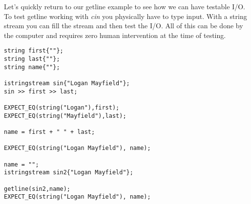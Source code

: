 \documentclass[]{tufte-handout}
\begin{document}
Let's quickly return to our getline example to see how we can have testable I/O.  To test getline working with \textit{cin} you physically have to type input. With a string stream you can fill the stream and then test the I/O. All of this can be done by the computer and requires zero human intervention at the time of testing.
\begin{verbatim}
string first{""};
string last{""};
string name{""};

istringstream sin{"Logan Mayfield"};
sin >> first >> last;

EXPECT_EQ(string("Logan"),first);
EXPECT_EQ(string("Mayfield"),last);
    
name = first + " " + last;

EXPECT_EQ(string("Logan Mayfield"), name);

name = "";
istringstream sin2{"Logan Mayfield"};

getline(sin2,name);
EXPECT_EQ(string("Logan Mayfield"), name);
\end{verbatim}
\end{document}
